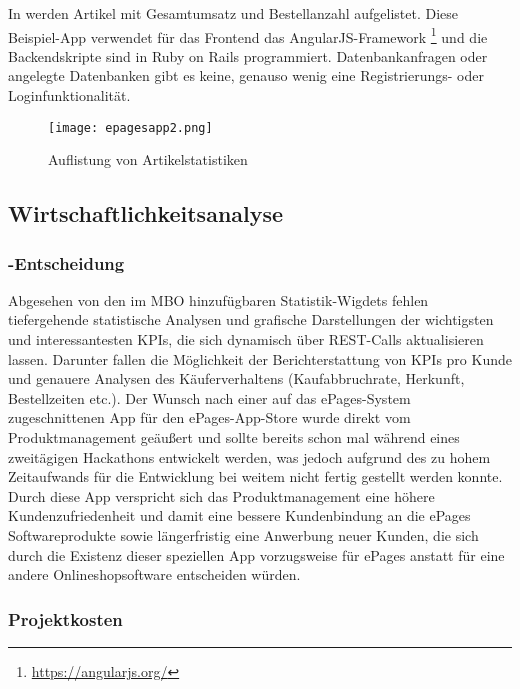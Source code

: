 In  werden Artikel mit Gesamtumsatz und Bestellanzahl aufgelistet. Diese Beispiel-App verwendet für das Frontend das AngularJS-Framework \footnote{\url{https://angularjs.org/}} und die Backendskripte sind in Ruby on Rails programmiert. Datenbankanfragen oder angelegte Datenbanken gibt es keine, genauso wenig eine Registrierungs- oder Loginfunktionalität.

\begin{figure}[htb]
\begin{center}
\texttt{[image: epagesapp2.png]}
\caption{Auflistung von Artikelstatistiken}
\label{fig:product}
\end{center}
\end{figure}
 
\subsection{Wirtschaftlichkeitsanalyse}
\label{sec:Wirtschaftlichkeitsanalyse}

\subsubsection{-Entscheidung}
\label{sec:MakeOrBuyEntscheidung}

Abgesehen von den im \acs{MBO} hinzufügbaren Statistik-Wigdets
fehlen tiefergehende statistische Analysen und grafische Darstellungen der wichtigsten und interessantesten KPIs, die sich dynamisch über REST-Calls aktualisieren lassen. Darunter fallen die Möglichkeit der Berichterstattung von KPIs pro Kunde und genauere Analysen des Käuferverhaltens (Kaufabbruchrate, Herkunft, Bestellzeiten etc.). Der Wunsch nach einer auf das ePages-System zugeschnittenen App für den ePages-App-Store wurde direkt vom Produktmanagement geäußert und sollte bereits schon mal während eines zweitägigen Hackathons entwickelt werden, was jedoch aufgrund des zu hohem Zeitaufwands für die Entwicklung bei weitem nicht fertig gestellt werden konnte. Durch diese App verspricht sich das Produktmanagement eine höhere Kundenzufriedenheit und damit eine bessere Kundenbindung an die ePages Softwareprodukte sowie längerfristig eine Anwerbung neuer Kunden, die sich durch die Existenz dieser speziellen App vorzugsweise für ePages anstatt für eine andere Onlineshopsoftware entscheiden würden.
\subsubsection{Projektkosten}
\label{sec:Projektkosten}

